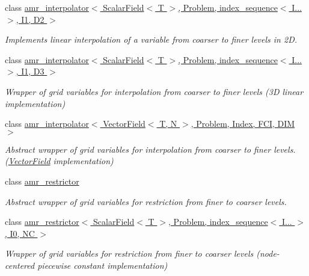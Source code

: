 \begin{DoxyCompactItemize}
class \hyperlink{classUintah_1_1PhaseField_1_1detail_1_1amr__interpolator_3_01ScalarField_3_01T_01_4_00_01Problemd2db9de1754b5450c93c191a9275f5ed}{amr\+\_\+interpolator$<$ Scalar\+Field$<$ T $>$, Problem, index\+\_\+sequence$<$ I... $>$, I1, D2 $>$}
\begin{DoxyCompactList}\small\item\em Implements linear interpolation of a variable from coarser to finer levels in 2D. \end{DoxyCompactList}\item 
class \hyperlink{classUintah_1_1PhaseField_1_1detail_1_1amr__interpolator_3_01ScalarField_3_01T_01_4_00_01Problemdf68628a6010a1e1526666730125c372}{amr\+\_\+interpolator$<$ Scalar\+Field$<$ T $>$, Problem, index\+\_\+sequence$<$ I... $>$, I1, D3 $>$}
\begin{DoxyCompactList}\small\item\em Wrapper of grid variables for interpolation from coarser to finer levels (3D linear implementation) \end{DoxyCompactList}\item 
class \hyperlink{classUintah_1_1PhaseField_1_1detail_1_1amr__interpolator_3_01VectorField_3_01T_00_01N_01_4_00_01ab3739ebd28e1ffb5bc0b138cfaddd80}{amr\+\_\+interpolator$<$ Vector\+Field$<$ T, N $>$, Problem, Index, F\+C\+I, D\+I\+M $>$}
\begin{DoxyCompactList}\small\item\em Abstract wrapper of grid variables for interpolation from coarser to finer levels. (\hyperlink{structUintah_1_1PhaseField_1_1VectorField}{Vector\+Field} implementation) \end{DoxyCompactList}\item 
class \hyperlink{classUintah_1_1PhaseField_1_1detail_1_1amr__restrictor}{amr\+\_\+restrictor}
\begin{DoxyCompactList}\small\item\em Abstract wrapper of grid variables for restriction from finer to coarser levels. \end{DoxyCompactList}\item 
class \hyperlink{classUintah_1_1PhaseField_1_1detail_1_1amr__restrictor_3_01ScalarField_3_01T_01_4_00_01Problem_05760ee5d1d3adcc969b3f56f71e72acb}{amr\+\_\+restrictor$<$ Scalar\+Field$<$ T $>$, Problem, index\+\_\+sequence$<$ I... $>$, I0, N\+C $>$}
\begin{DoxyCompactList}\small\item\em Wrapper of grid variables for restriction from finer to coarser levels (node-\/centered piecewise constant implementation) \end{DoxyCompactList}\item 

\end{DoxyCompactItemize}
